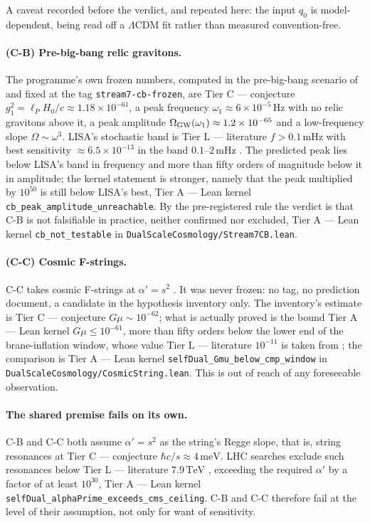 \documentclass[11pt,a4paper]{article}
\theoremstyle{remark}
\newcommand{\tierA}{\colorbox{green!15}{\textsf{\scriptsize Tier A --- Lean kernel}}}
\newcommand{\tierL}{\colorbox{blue!10}{\textsf{\scriptsize Tier L --- literature}}}
\newcommand{\tierC}{\colorbox{orange!15}{\textsf{\scriptsize Tier C --- conjecture}}}
\newcommand{\lean}[1]{\texttt{#1}}
\begin{document}
\begin{scopebox}
A caveat recorded before the verdict, and repeated here: the input $q_0$ is model-dependent,
being read off a $\Lambda$CDM fit rather than measured convention-free.
\end{scopebox}

\paragraph{(C-B) Pre-big-bang relic gravitons.}
The programme's own frozen numbers, computed in the pre-big-bang scenario of
\cite{GasperiniVeneziano2002} and fixed at the tag \texttt{stream7-cb-frozen}, are \tierC{}
$g_1^2 = \ell_P H_0/c \approx 1.18\times10^{-61}$, a peak frequency
$\omega_1 \approx 6\times10^{-5}\,\mathrm{Hz}$ with no relic gravitons above it, a peak amplitude
$\Omega_{\rm GW}(\omega_1) \approx 1.2\times10^{-65}$ and a low-frequency slope
$\Omega \sim \omega^3$. LISA's stochastic band is \tierL{} $f > 0.1\,\mathrm{mHz}$ with best
sensitivity $\approx 6.5\times10^{-13}$ in the band $0.1$--$2\,\mathrm{mHz}$ \cite{LISA2017}. The
predicted peak lies below LISA's band in frequency and more than fifty orders of magnitude below
it in amplitude; the kernel statement is stronger, namely that the peak multiplied by $10^{50}$
is still below LISA's best, \tierA{} \lean{cb\_peak\_amplitude\_unreachable}. By the pre-registered
rule the verdict is that C-B is not falsifiable in practice, neither confirmed nor excluded,
\tierA{} \lean{cb\_not\_testable} in \lean{DualScaleCosmology/Stream7CB.lean}.

\paragraph{(C-C) Cosmic F-strings.}
C-C takes cosmic F-strings at $\alpha' = s^2$ \cite{CMP2004}. It was never frozen: no tag, no
prediction document, a candidate in the hypothesis inventory only. The inventory's estimate is
\tierC{} $G\mu \sim 10^{-62}$; what is actually proved is the bound \tierA{}
$G\mu \le 10^{-61}$, more than fifty orders below the lower end of the brane-inflation window,
whose value \tierL{} $10^{-11}$ is taken from \cite{CMP2004}; the comparison is
\tierA{} \lean{selfDual\_Gmu\_below\_cmp\_window} in
\lean{DualScaleCosmology/CosmicString.lean}. This is out of reach of any foreseeable
observation.

\paragraph{The shared premise fails on its own.}
C-B and C-C both assume $\alpha' = s^2$ as the string's Regge slope, that is, string resonances
at \tierC{} $\hbar c/s \approx 4\,\mathrm{meV}$. LHC searches exclude such resonances below
\tierL{} $7.9\,\mathrm{TeV}$ \cite{CMS2020}, exceeding the required $\alpha'$ by a factor of at
least $10^{30}$, \tierA{} \lean{selfDual\_alphaPrime\_exceeds\_cms\_ceiling}. C-B and C-C therefore
fail at the level of their assumption, not only for want of sensitivity.
\end{document}
